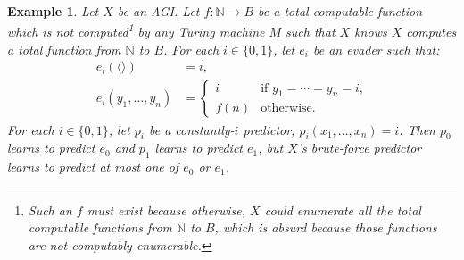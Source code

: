 \documentclass{article}
\newtheorem{example}[theorem]{Example}
\begin{document}
\begin{example}
\label{bruteforcenottotallyoptimalexample}
    Let $X$ be an AGI. Let $f:\mathbb N\to B$ be a total computable function
    which is not computed\footnote{Such an $f$ must exist because
    otherwise, $X$ could enumerate all the total
    computable functions from $\mathbb N$ to $B$, which is absurd because those functions
    are not computably enumerable.} by any Turing machine $M$ such that $X$ knows $X$ computes
    a total function from $\mathbb N$ to $B$.
    For each $i\in\{0,1\}$, let $e_i$ be an evader such that:
    \begin{align*}
        e_i(\langle\rangle) &= i,\\
        e_i(y_1,\ldots,y_n) &=
        \begin{cases}
            i &\mbox{if $y_1=\cdots=y_n=i$,}\\
            f(n) &\mbox{otherwise.}
        \end{cases}
    \end{align*}
    For each $i\in\{0,1\}$, let $p_i$ be a
    constantly-$i$ predictor, $p_i(x_1,\ldots,x_n)=i$.
    Then $p_0$ learns to predict $e_0$ and $p_1$ learns to predict $e_1$,
    but $X$'s brute-force predictor learns to predict at most one of $e_0$ or $e_1$.
\end{example}
\end{document}
